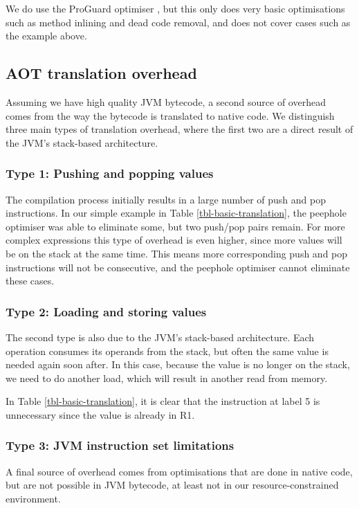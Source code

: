 We do use the ProGuard optimiser \cite{proguard}, but this only does very basic optimisations such as method inlining and dead code removal, and does not cover cases such as the example above.

\subsection{AOT translation overhead}
\label{sec-overhead-aot-translation}
Assuming we have high quality JVM bytecode, a second source of overhead comes from the way the bytecode is translated to native code. We distinguish three main types of translation overhead, where the first two are a direct result of the JVM's stack-based architecture.

\subsubsection{Type 1: Pushing and popping values} The compilation process initially results in a large number of push and pop instructions. In our simple example in Table \ref{tbl-basic-translation}, the peephole optimiser was able to eliminate some, but two push/pop pairs remain. For more complex expressions this type of overhead is even higher, since more values will be on the stack at the same time. This means more corresponding push and pop instructions will not be consecutive, and the peephole optimiser cannot eliminate these cases.

\subsubsection{Type 2: Loading and storing values} The second type is also due to the JVM's stack-based architecture. Each operation consumes its operands from the stack, but often the same value is needed again soon after. In this case, because the value is no longer on the stack, we need to do another load, which will result in another read from memory.

In Table \ref{tbl-basic-translation}, it is clear that the  instruction at label 5 is unnecessary since the value is already in R1.

\subsubsection{Type 3: JVM instruction set limitations} A final source of overhead comes from optimisations that are done in native code, but are not possible in JVM bytecode, at least not in our resource-constrained environment.

